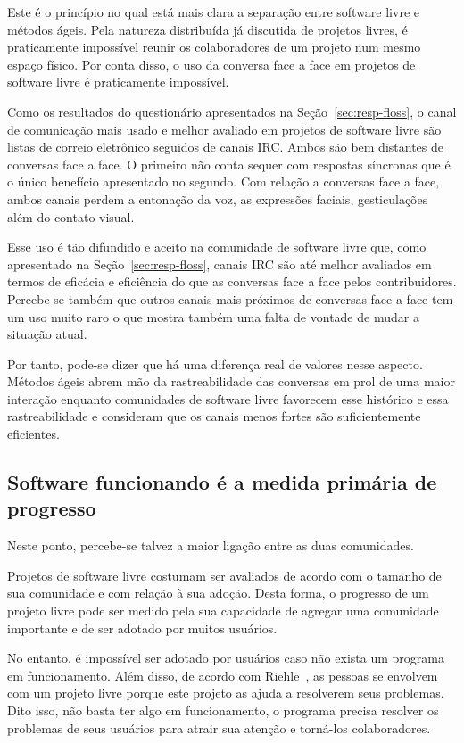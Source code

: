 Este é o princípio no qual está mais clara a separação entre software
livre e métodos ágeis. Pela natureza distribuída já discutida de
projetos livres, é praticamente impossível reunir os colaboradores de
um projeto num mesmo espaço físico. Por conta disso, o uso da conversa
face a face em projetos de software livre é praticamente impossível.

Como os resultados do questionário apresentados na
Seção~\ref{sec:resp-floss}, o canal de comunicação mais usado e melhor
avaliado em projetos de software livre são listas de correio
eletrônico seguidos de canais IRC. Ambos são bem distantes de
conversas face a face. O primeiro não conta sequer com respostas
síncronas que é o único benefício apresentado no segundo. Com relação
a conversas face a face, ambos canais perdem a entonação da voz, as
expressões faciais, gesticulações além do contato visual.

Esse uso é tão difundido e aceito na comunidade de software livre que,
como apresentado na Seção~\ref{sec:resp-floss}, canais IRC são até
melhor avaliados em termos de eficácia e eficiência do que as
conversas face a face pelos contribuidores. Percebe-se também que
outros canais mais próximos de conversas face a face tem um uso muito
raro o que mostra também uma falta de vontade de mudar a situação
atual.

Por tanto, pode-se dizer que há uma diferença real de valores nesse
aspecto. Métodos ágeis abrem mão da rastreabilidade das conversas em
prol de uma maior interação enquanto comunidades de software livre
favorecem esse histórico e essa rastreabilidade e consideram que os
canais menos fortes são suficientemente eficientes.

\subsection[Software funcionando]{Software funcionando é a medida
  primária de progresso}

Neste ponto, percebe-se talvez a maior ligação entre as duas
comunidades.

Projetos de software livre costumam ser avaliados de acordo com o
tamanho de sua comunidade e com relação à sua adoção. Desta forma, o
progresso de um projeto livre pode ser medido pela sua capacidade de
agregar uma comunidade importante e de ser adotado por muitos
usuários.

No entanto, é impossível ser adotado por usuários caso não exista um
programa em funcionamento. Além disso, de acordo com
Riehle~\cite{Riehle2007}, as pessoas se envolvem com um projeto livre
porque este projeto as ajuda a resolverem seus problemas. Dito isso,
não basta ter algo em funcionamento, o programa precisa resolver os
problemas de seus usuários para atrair sua atenção e torná-los
colaboradores.

